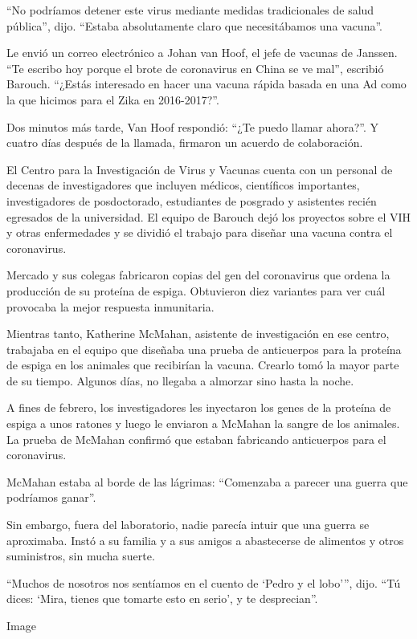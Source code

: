 ``No podríamos detener este virus mediante medidas tradicionales de
salud pública'', dijo. ``Estaba absolutamente claro que necesitábamos
una vacuna''.

Le envió un correo electrónico a Johan van Hoof, el jefe de vacunas de
Janssen. ``Te escribo hoy porque el brote de coronavirus en China se ve
mal'', escribió Barouch. ``¿Estás interesado en hacer una vacuna rápida
basada en una Ad como la que hicimos para el Zika en 2016-2017?''.

Dos minutos más tarde, Van Hoof respondió: ``¿Te puedo llamar ahora?''.
Y cuatro días después de la llamada, firmaron un acuerdo de
colaboración.

El Centro para la Investigación de Virus y Vacunas cuenta con un
personal de decenas de investigadores que incluyen médicos, científicos
importantes, investigadores de posdoctorado, estudiantes de posgrado y
asistentes recién egresados de la universidad. El equipo de Barouch dejó
los proyectos sobre el VIH y otras enfermedades y se dividió el trabajo
para diseñar una vacuna contra el coronavirus.

Mercado y sus colegas fabricaron copias del gen del coronavirus que
ordena la producción de su proteína de espiga. Obtuvieron diez variantes
para ver cuál provocaba la mejor respuesta inmunitaria.

Mientras tanto, Katherine McMahan, asistente de investigación en ese
centro, trabajaba en el equipo que diseñaba una prueba de anticuerpos
para la proteína de espiga en los animales que recibirían la vacuna.
Crearlo tomó la mayor parte de su tiempo. Algunos días, no llegaba a
almorzar sino hasta la noche.

A fines de febrero, los investigadores les inyectaron los genes de la
proteína de espiga a unos ratones y luego le enviaron a McMahan la
sangre de los animales. La prueba de McMahan confirmó que estaban
fabricando anticuerpos para el coronavirus.

McMahan estaba al borde de las lágrimas: ``Comenzaba a parecer una
guerra que podríamos ganar''.

Sin embargo, fuera del laboratorio, nadie parecía intuir que una guerra
se aproximaba. Instó a su familia y a sus amigos a abastecerse de
alimentos y otros suministros, sin mucha suerte.

``Muchos de nosotros nos sentíamos en el cuento de `Pedro y el lobo''',
dijo. ``Tú dices: `Mira, tienes que tomarte esto en serio', y te
desprecian''.

Image

